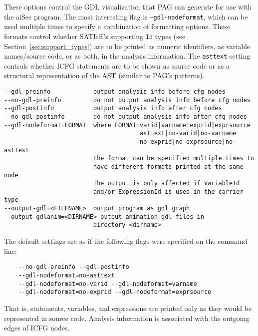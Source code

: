 \documentclass[a4paper,12pt]{report}
\begin{document}
These options control the GDL visualization that PAG can generate for use
with the aiSee program. The most interesting flag is
\texttt{--gdl-nodeformat}, which can be used multiple times to specify a
combination of formatting options. These formats control whether SATIrE's
supporting \texttt{Id} types (see Section~\ref{sec:support_types}) are to be
printed as numeric identifiers, as variable names/source code, or as both,
in the analysis information. The \texttt{asttext} setting controls whether
ICFG statements are to be shown as source code or as a structural
representation of the AST (similar to PAG's patterns).

{\footnotesize
\begin{verbatim}
--gdl-preinfo            output analysis info before cfg nodes
--no-gdl-preinfo         do not output analysis info before cfg nodes
--gdl-postinfo           output analysis info after cfg nodes
--no-gdl-postinfo        do not output analysis info after cfg nodes
--gdl-nodeformat=FORMAT  where FORMAT=varid|varname|exprid|exprsource
                                     |asttext|no-varid|no-varname
                                     |no-exprid|no-exprsource|no-asttext
                         the format can be specified multiple times to
                         have different formats printed at the same node
                         The output is only affected if VariableId
                         and/or ExpressionId is used in the carrier type
--output-gdl=<FILENAME>  output program as gdl graph
--output-gdlanim=<DIRNAME> output animation gdl files in 
                         directory <dirname>
\end{verbatim}
}

The default settings are as if the following flags were specified on the
command line:
{\footnotesize
\begin{verbatim}
    --no-gdl-preinfo --gdl-postinfo
    --gdl-nodeformat=no-asttext
    --gdl-nodeformat=no-varid --gdl-nodeformat=varname
    --gdl-nodeformat=no-exprid --gdl-nodeformat=exprsource
\end{verbatim}
}

That is, statements, variables, and expressions are printed only as they
would be represented in source code. Analysis information is associated with
the outgoing edges of ICFG nodes.
\end{document}
